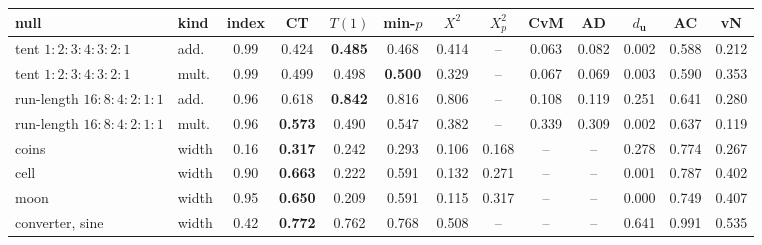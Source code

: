 \begin{tabular}{@{}llc cccccccccc@{}}
\toprule
null & kind & index & CT & $T(1)$ & min-$p$ & $X^2$ & $X^2_p$ & CvM & AD & $d_{\mathbf u}$ & AC & vN \\
\midrule
tent $1{:}2{:}3{:}4{:}3{:}2{:}1$ & add. & 0.99 & 0.424 & \textbf{0.485} & 0.468 & 0.414 & -- & 0.063 & 0.082 & 0.002 & 0.588 & 0.212 \\
tent $1{:}2{:}3{:}4{:}3{:}2{:}1$ & mult. & 0.99 & 0.499 & 0.498 & \textbf{0.500} & 0.329 & -- & 0.067 & 0.069 & 0.003 & 0.590 & 0.353 \\
run-length $16{:}8{:}4{:}2{:}1{:}1$ & add. & 0.96 & 0.618 & \textbf{0.842} & 0.816 & 0.806 & -- & 0.108 & 0.119 & 0.251 & 0.641 & 0.280 \\
run-length $16{:}8{:}4{:}2{:}1{:}1$ & mult. & 0.96 & \textbf{0.573} & 0.490 & 0.547 & 0.382 & -- & 0.339 & 0.309 & 0.002 & 0.637 & 0.119 \\
\midrule
coins & width & 0.16 & \textbf{0.317} & 0.242 & 0.293 & 0.106 & 0.168 & -- & -- & 0.278 & 0.774 & 0.267 \\
cell & width & 0.90 & \textbf{0.663} & 0.222 & 0.591 & 0.132 & 0.271 & -- & -- & 0.001 & 0.787 & 0.402 \\
moon & width & 0.95 & \textbf{0.650} & 0.209 & 0.591 & 0.115 & 0.317 & -- & -- & 0.000 & 0.749 & 0.407 \\
\midrule
converter, sine & width & 0.42 & \textbf{0.772} & 0.762 & 0.768 & 0.508 & -- & -- & -- & 0.641 & 0.991 & 0.535 \\
\bottomrule
\end{tabular}

